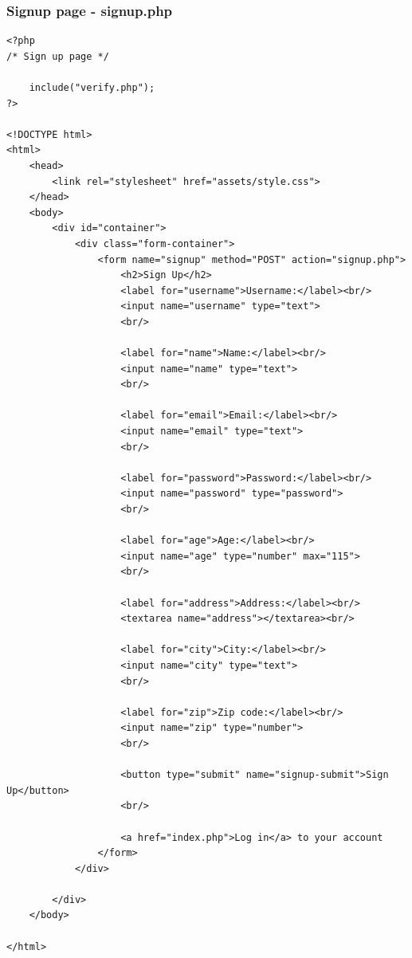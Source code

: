 \documentclass{article}
\begin{document}
\subsubsection{Signup page - signup.php}
\begin{verbatim}
<?php
/* Sign up page */

	include("verify.php");
?>

<!DOCTYPE html>
<html>
	<head>
		<link rel="stylesheet" href="assets/style.css">
	</head>
	<body>
		<div id="container">
			<div class="form-container">
				<form name="signup" method="POST" action="signup.php">
					<h2>Sign Up</h2>
					<label for="username">Username:</label><br/>
					<input name="username" type="text">
					<br/>

                    <label for="name">Name:</label><br/>
					<input name="name" type="text">
                    <br/>
                    
					<label for="email">Email:</label><br/>
					<input name="email" type="text">
					<br/>

					<label for="password">Password:</label><br/>
					<input name="password" type="password">
                    <br/>

                    <label for="age">Age:</label><br/>
                    <input name="age" type="number" max="115">
                    <br/>

                    <label for="address">Address:</label><br/>
                    <textarea name="address"></textarea><br/>

                    <label for="city">City:</label><br/>
					<input name="city" type="text">
                    <br/>

                    <label for="zip">Zip code:</label><br/>
					<input name="zip" type="number">
                    <br/>

					<button type="submit" name="signup-submit">Sign Up</button>
					<br/>
						
					<a href="index.php">Log in</a> to your account
				</form>
			</div>

		</div>
	</body>

</html>
\end{verbatim}
\end{document}
